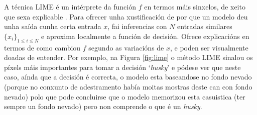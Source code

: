 A técnica LIME \cite{LIME} é un intérprete da función $f$ en termos máis sinxelos, de xeito que sexa explicable . Para ofrecer unha xustificación de por que un modelo deu unha saída cunha certa entrada $x$, fai inferencias con $N$ entradas similares $\{x_i\}_{1\leq i\leq N}$ e aproxima localmente a función de decisión. Ofrece explicacións en termos de como cambiou $f$ segundo as variacións de $x$, e poden ser visualmente doadas de entender. Por exemplo, na Figura \ref{fig:lime} o método LIME sinalou os \glspl{píxel} máis importantes para tomar a decisión `\emph{husky}' e pódese ver que neste caso, aínda que a decisión é correcta, o modelo esta baseandose no fondo nevado (porque no conxunto de adestramento había moitas mostras deste can con fondo nevado) polo que pode concluirse que o modelo memorizou esta casuistica (ter sempre un fondo nevado) pero non comprende o que é un \emph{husky}.

